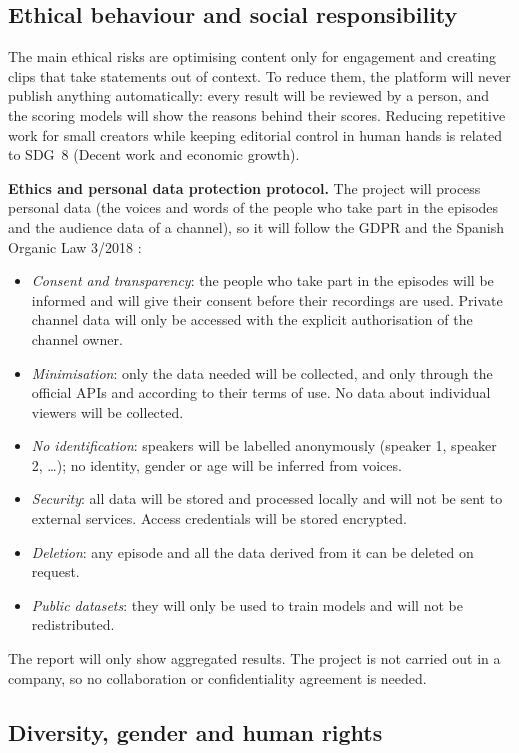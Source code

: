 \documentclass[ENG]{TFUOC}
\begin{document}
\subsection*{Ethical behaviour and social responsibility}

The main ethical risks are optimising content only for engagement and creating clips that take statements out of context. To reduce them, the platform will never publish anything automatically: every result will be reviewed by a person, and the scoring models will show the reasons behind their scores. Reducing repetitive work for small creators while keeping editorial control in human hands is related to SDG~8 (Decent work and economic growth).

\textbf{Ethics and personal data protection protocol.} The project will process personal data (the voices and words of the people who take part in the episodes and the audience data of a channel), so it will follow the GDPR \cite{gdpr2016} and the Spanish Organic Law 3/2018 \cite{lopdgdd2018}:
\begin{itemize}
\item \textit{Consent and transparency}: the people who take part in the episodes will be informed and will give their consent before their recordings are used. Private channel data will only be accessed with the explicit authorisation of the channel owner.
\item \textit{Minimisation}: only the data needed will be collected, and only through the official APIs and according to their terms of use. No data about individual viewers will be collected.
\item \textit{No identification}: speakers will be labelled anonymously (speaker 1, speaker 2, \dots); no identity, gender or age will be inferred from voices.
\item \textit{Security}: all data will be stored and processed locally and will not be sent to external services. Access credentials will be stored encrypted.
\item \textit{Deletion}: any episode and all the data derived from it can be deleted on request.
\item \textit{Public datasets}: they will only be used to train models and will not be redistributed.
\end{itemize}
The report will only show aggregated results. The project is not carried out in a company, so no collaboration or confidentiality agreement is needed.

\subsection*{Diversity, gender and human rights}
\end{document}
